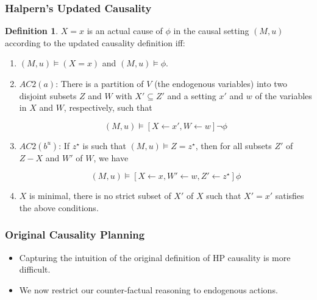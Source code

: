 \documentclass{beamer}
\theoremstyle{plain}
\theoremstyle{definition}
\newtheorem{defn}[thm]{Definition} %
\begin{document}
\begin{frame}
\frametitle{Halpern's Updated Causality}
\begin{defn}$X=x$ is an actual cause of $\phi$ in the causal setting $(M,u)$ according to the updated causality definition iff:
\begin{enumerate}
\item $(M,u) \models (X=x)$ and $(M,u) \models \phi$.
\item $AC2(a)$: There is a partition of $V$ (the endogenous variables) into two disjoint subsets $Z$ and $W$ with $X'\subseteq Z'$ and a setting $x'$ and $w$ of the variables in $X$ and $W$, respectively, such that

\[
(M,u) \models [X\leftarrow x', W\leftarrow w]\lnot \phi
\] 

\item $AC2(b^u)$: If $z^\star$ is such that $(M,u)\models Z = z^\star$, then for all subsets $Z'$ of $Z-X$ and $W'$ of $W$, we have

\[
(M,u) \models [X\leftarrow x, W' \leftarrow w, Z' \leftarrow z^\star]\phi
\] 

\item $X$ is minimal, there is no strict subset of $X'$ of $X$ such that $X' = x'$ satisfies the above conditions.
\end{enumerate}

\end{defn}
\end{frame}






\begin{frame}
\frametitle{Original Causality Planning}
\begin{itemize}
\item Capturing the intuition of the original definition of HP causality is more difficult.
\item We now restrict our counter-factual reasoning to endogenous actions.
\end{itemize}

\end{frame}
\end{document}
